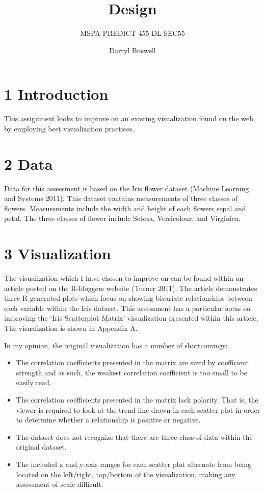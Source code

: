 \documentclass[]{article}
\title{Design}
\subtitle{MSPA PREDICT 455-DL-SEC55}
\author{Darryl Buswell}
\date{}
\providecommand{\tightlist}{%
  \setlength{\itemsep}{0pt}\setlength{\parskip}{0pt}}
\begin{document}
\maketitle

\newpage

\section{1 Introduction}\label{introduction}

This assignment looks to improve on an existing visualization found on
the web by employing best visualization practices.

\section{2 Data}\label{data}

Data for this assessment is based on the Iris flower dataset (Machine
Learning and Systems 2011). This dataset contains measurements of three
classes of flowers. Measurements include the width and height of each
flowers sepal and petal. The three classes of flower include Setosa,
Versicolour, and Virginica.

\section{3 Visualization}\label{visualization}

The visualization which I have chosen to improve on can be found within
an article posted on the R-bloggers website (Turner 2011). The article
demonstrates three R generated plots which focus on showing bivariate
relationships between each variable within the Iris dataset. This
assessment has a particular focus on improving the `Iris Scatterplot
Matrix' visualization presented within this article. The visualization
is shown in Appendix A.

In my opinion, the original visualization has a number of shortcomings:

\begin{itemize}
\tightlist
\item
  The correlation coefficients presented in the matrix are sized by
  coefficient strength and as such, the weakest correlation coefficient
  is too small to be easily read.
\item
  The correlation coefficients presented in the matrix lack polarity.
  That is, the viewer is required to look at the trend line drawn in
  each scatter plot in order to determine whether a relationship is
  positive or negative.
\item
  The dataset does not recognize that there are three class of data
  within the original dataset.
\item
  The included x and y-axis ranges for each scatter plot alternate from
  being located on the left/right, top/bottom of the visualization,
  making any assessment of scale difficult.
\end{itemize}
\end{document}
